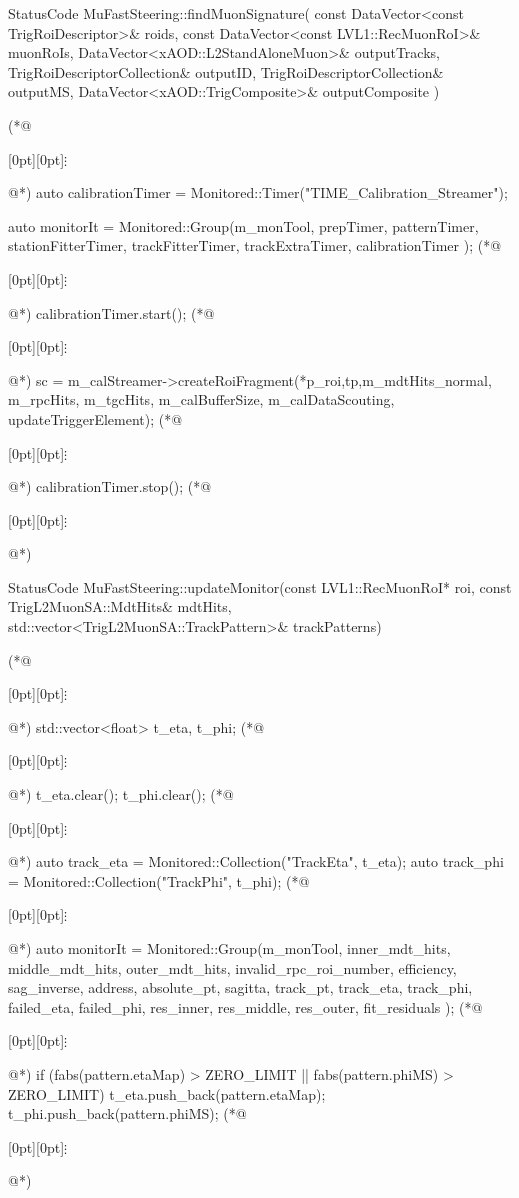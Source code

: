 \begin{cpp}[caption={Fragment kodu algorytmu~\cite{histogram-fill}, odpowiadającego za wypełnienie histogramu przedstawionego na \figref{fig:athena:histogram_TH1_time}, za pomocą zmiennej monitorowanej `TIME\_Calibration\_Streamer`.}, label={lst:athena:time_calibration_streamer}]
StatusCode MuFastSteering::findMuonSignature(
  const DataVector<const TrigRoiDescriptor>& roids,
  const DataVector<const LVL1::RecMuonRoI>& muonRoIs,
  DataVector<xAOD::L2StandAloneMuon>& outputTracks,
  TrigRoiDescriptorCollection& outputID,
  TrigRoiDescriptorCollection& outputMS,
  DataVector<xAOD::TrigComposite>& outputComposite )
{
(*@\centerline{\raisebox{-1pt}[0pt][0pt]{$\vdots$}}@*)
  auto calibrationTimer = Monitored::Timer("TIME_Calibration_Streamer");

  auto monitorIt	= Monitored::Group(m_monTool, prepTimer, patternTimer, stationFitterTimer, trackFitterTimer, trackExtraTimer, calibrationTimer );
(*@\centerline{\raisebox{-1pt}[0pt][0pt]{$\vdots$}}@*)
  calibrationTimer.start();
(*@\centerline{\raisebox{-1pt}[0pt][0pt]{$\vdots$}}@*)
  sc = m_calStreamer->createRoiFragment(*p_roi,tp,m_mdtHits_normal, m_rpcHits, m_tgcHits, m_calBufferSize, m_calDataScouting, updateTriggerElement); 
(*@\centerline{\raisebox{-1pt}[0pt][0pt]{$\vdots$}}@*)
  calibrationTimer.stop();
(*@\centerline{\raisebox{-1pt}[0pt][0pt]{$\vdots$}}@*)
}
\end{cpp}

\begin{cpp}[caption={Fragment kodu algorytmu~\cite{histogram-fill}, odpowiadającego za wypełnienie histogramu przedstawionego na \figref{fig:athena:histogram_TH2}, za pomocą monitorowanych kolekcji `TrackEta` oraz `TrackPhi`.}, label={lst:athena:track_eta_vs_track_phi}]
StatusCode MuFastSteering::updateMonitor(const LVL1::RecMuonRoI* roi,
  const TrigL2MuonSA::MdtHits& mdtHits,
  std::vector<TrigL2MuonSA::TrackPattern>& trackPatterns)
{
(*@\centerline{\raisebox{-1pt}[0pt][0pt]{$\vdots$}}@*)
  std::vector<float> t_eta, t_phi;
(*@\centerline{\raisebox{-1pt}[0pt][0pt]{$\vdots$}}@*)
  t_eta.clear();
  t_phi.clear();
(*@\centerline{\raisebox{-1pt}[0pt][0pt]{$\vdots$}}@*)
  auto track_eta	= Monitored::Collection("TrackEta", t_eta);
  auto track_phi	= Monitored::Collection("TrackPhi", t_phi);
(*@\centerline{\raisebox{-1pt}[0pt][0pt]{$\vdots$}}@*)
  auto monitorIt	= Monitored::Group(m_monTool, inner_mdt_hits, middle_mdt_hits, outer_mdt_hits, invalid_rpc_roi_number, efficiency, sag_inverse, address, absolute_pt, sagitta, track_pt, track_eta, track_phi, failed_eta, failed_phi, res_inner, res_middle, res_outer, fit_residuals );
(*@\centerline{\raisebox{-1pt}[0pt][0pt]{$\vdots$}}@*)
  if (fabs(pattern.etaMap) > ZERO_LIMIT || fabs(pattern.phiMS) > ZERO_LIMIT) {
    t_eta.push_back(pattern.etaMap);
    t_phi.push_back(pattern.phiMS);
  }
(*@\centerline{\raisebox{-1pt}[0pt][0pt]{$\vdots$}}@*)
}
\end{cpp}

